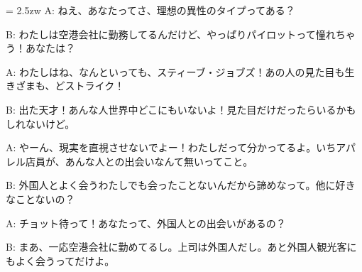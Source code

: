 \documentclass[11pt]{amsart}
\title{}
\author{}
\newenvironment{hangall}[1]{\hangindent = 2.5zw\everypar{\hangindent = 2.5zw}}{}
\begin{document}
\maketitle
\begin{hangall}{}%
A: ねえ、あなたってさ、理想の異性のタイプってある？



B: わたしは空港会社に勤務してるんだけど、やっぱりパイロットって憧れちゃう！あなたは？



A: わたしはね、なんといっても、スティーブ・ジョブズ！あの人の見た目も生きざまも、どストライク！



B: 出た天才！あんな人世界中どこにもいないよ！見た目だけだったらいるかもしれないけど。



A: やーん、現実を直視させないでよー！わたしだって分かってるよ。いちアパレル店員が、あんな人との出会いなんて無いってこと。



B: 外国人とよく会うわたしでも会ったことないんだから諦めなって。他に好きなことないの？



A: チョット待って！あなたって、外国人との出会いがあるの？



B: まあ、一応空港会社に勤めてるし。上司は外国人だし。あと外国人観光客にもよく会うってだけよ。\end{hangall}
\end{document}

